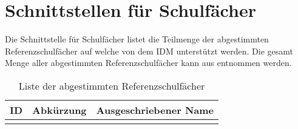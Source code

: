 \section{Schnittstellen für Schulfächer}
Die Schnittstelle für Schulfächer listet die Teilmenge der abgestimmten Referenzschulfächer auf welche von dem IDM unterstützt werden.
Die gesamt Menge aller abgestimmten Referenzschulfächer kann aus  entnommen werden.

\begin{longtable}{|p{}|p{}|p{}|}
\caption{Liste der abgestimmten Referenzschulfächer}
\endfoot
\caption{Liste der abgestimmten Referenzschulfächer}
		\label{tab:rest:api:school-subjects:list}
\endlastfoot 
\hline
\textbf{ID} & \textbf{Abkürzung} & \textbf{Ausgeschriebener Name} \\ \hline
\endhead
 & &  \\ \hline
	\end{longtable}

